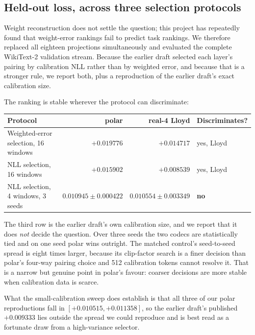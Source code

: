 \subsection{Held-out loss, across three selection protocols}

Weight reconstruction does not settle the question; this project has repeatedly
found that weight-error rankings fail to predict task rankings. We therefore
replaced all eighteen projections simultaneously and evaluated the complete
WikiText-2 validation stream. Because the earlier draft selected each layer's
pairing by calibration NLL rather than by weighted error, and because that is a
stronger rule, we report both, plus a reproduction of the earlier draft's exact
calibration size.




The ranking is stable wherever the protocol can discriminate:

\begin{center}\small
\begin{tabular}{lrrl}\toprule
Protocol & polar & real-4 Lloyd & Discriminates?\\\midrule
Weighted-error selection, 16 windows & $+0.019776$ & $+0.014717$ & yes, Lloyd\\
NLL selection, 16 windows & $+0.015902$ & $+0.008539$ & yes, Lloyd\\
NLL selection, 4 windows, 3 seeds & $0.010945\pm0.000422$ & $0.010554\pm0.003349$ & \textbf{no}\\\bottomrule
\end{tabular}
\end{center}

The third row is the earlier draft's own calibration size, and we report that it
does \emph{not} decide the question. Over three seeds the two codecs are
statistically tied and on one seed polar wins outright. The matched control's
seed-to-seed spread is eight times larger, because its clip-factor search is a
finer decision than polar's four-way pairing choice and 512 calibration tokens
cannot resolve it. That is a narrow but genuine point in polar's favour: coarser
decisions are more stable when calibration data is scarce.

What the small-calibration sweep does establish is that all three of our polar
reproductions fall in $[+0.010515,+0.011358]$, so the earlier draft's published
$+0.009333$ lies outside the spread we could reproduce and is best read as a
fortunate draw from a high-variance selector.

